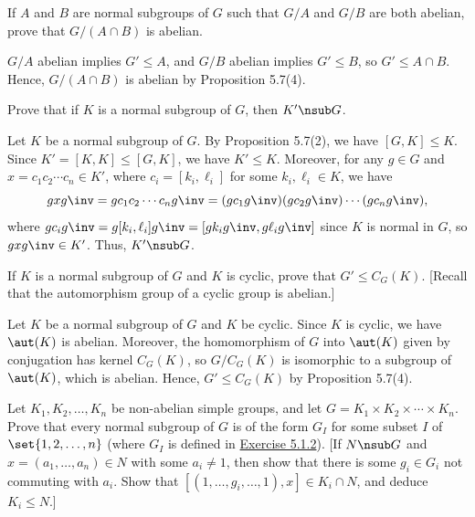 \begin{exercise}\label{ex5.4.15}
    If $A$ and $B$ are normal subgroups of $G$ such that $G/A$ and $G/B$ are both abelian, prove that $G/(A \cap B)$ is abelian.
\end{exercise}

\begin{sol}
    $G/A$ abelian implies $G' \leq A$, and $G/B$ abelian implies $G' \leq B$, so $G' \leq A \cap B$. Hence, $G/(A \cap B)$ is abelian by Proposition 5.7(4).
\end{sol}

\begin{exercise}\label{ex5.4.16}
    Prove that if $K$ is a normal subgroup of $G$, then $K' \nsub G$.
\end{exercise}

\begin{sol}
    Let $K$ be a normal subgroup of $G$. By Proposition 5.7(2), we have $[G, K] \leq K$. Since $K' = [K, K] \leq [G, K]$, we have $K' \leq K$. Moreover, for any $g \in G$ and $x = c_1 c_2 \cdots c_n \in K'$, where $c_i = [k_i, \ell_i]$ for some $k_i, \ell_i \in K$, we have
    \[g x g\inv = g c_1 c_2 \cdots c_n g\inv = (g c_1 g\inv)(g c_2 g\inv) \cdots (g c_n g\inv),\]
    where $g c_i g\inv = g [k_i, \ell_i] g\inv = [g k_i g\inv, g \ell_i g\inv]$ since $K$ is normal in $G$, so $g x g\inv \in K'$. Thus, $K' \nsub G$.
\end{sol}

\begin{exercise}\label{ex5.4.17}
    If $K$ is a normal subgroup of $G$ and $K$ is cyclic, prove that $G' \leq C_G(K)$. [Recall that the automorphism group of a cyclic group is abelian.]
\end{exercise}

\begin{sol}
    Let $K$ be a normal subgroup of $G$ and $K$ be cyclic. Since $K$ is cyclic, we have $\aut(K)$ is abelian. Moreover, the homomorphism of $G$ into $\aut(K)$ given by conjugation has kernel $C_G(K)$, so $G/C_G(K)$ is isomorphic to a subgroup of $\aut(K)$, which is abelian. Hence, $G' \leq C_G(K)$ by Proposition 5.7(4).
\end{sol}

\begin{exercise}\label{ex5.4.18}
    Let $K_1, K_2, \ldots, K_n$ be non-abelian simple groups, and let $G = K_1 \times K_2 \times \cdots \times K_n$. Prove that every normal subgroup of $G$ is of the form $G_I$ for some subset $I$ of $\set{1, 2, \ldots, n}$ (where $G_I$ is defined in \hyperref[ex5.1.2]{Exercise 5.1.2}). [If $N \nsub G$ and $x = (a_1, \ldots, a_n) \in N$ with some $a_i \neq 1$, then show that there is some $g_i \in G_i$ not commuting with $a_i$. Show that $[(1, \ldots, g_i, \ldots, 1), x] \in K_i \cap N$, and deduce $K_i \leq N$.]
\end{exercise}

